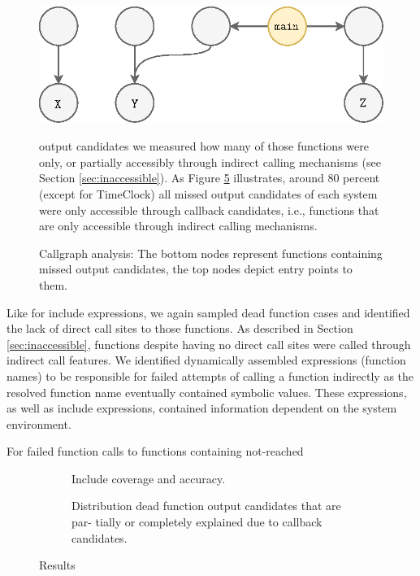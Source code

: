 \documentclass[sigconf]{acmart}
\begin{document}
\begin{figure}[t!]
	\includegraphics[scale=0.55]{images-paper/callgraph_cases}
    \caption{Callgraph analysis: The bottom nodes represent functions containing missed output candidates, the top nodes depict entry points to them.}
    \label{fig:callgraph} output candidates we measured how many of those functions were only, or partially accessibly through indirect calling mechanisms (see Section \ref{sec:inaccessible}). As Figure \ref{fig:output_candidate_explanation} illustrates, around 80 percent (except for \textsf{TimeClock}) all missed output candidates of each system were only accessible through callback candidates, i.e., functions that are only accessible through indirect calling mechanisms.
	
\end{figure}

Like for include expressions, we again sampled dead function cases and
identified the lack of direct call sites to those functions. As described in
Section \ref{sec:inaccessible}, functions despite having no direct call sites
were called through indirect call features. We identified dynamically assembled
expressions (function names) to be responsible for failed attempts of calling a
function indirectly as the resolved function name eventually contained symbolic
values. These expressions, as well as include expressions, contained
information dependent on the system environment.

For failed function calls to functions containing not-reached
	
	
\begin{figure}[h!]
	\begin{subfigure}[center]{0.48\textwidth}
		
		\caption{\label{coverage}}
	\end{subfigure}
	
	\begin{subfigure}[center]{0.48\textwidth}
		
		\caption{
			Include coverage and accuracy.
			\label{fig:include_coverage_results}
		}
	\end{subfigure}
	
	
	\begin{subfigure}[center]{0.48\textwidth}
		
		\caption{
			Distribution dead function output candidates that are par-
			tially or completely explained due to callback candidates.
			\label{fig:output_candidate_explanation}
		}
		
	\end{subfigure}
	\caption{Results}
\end{figure}
\end{document}
